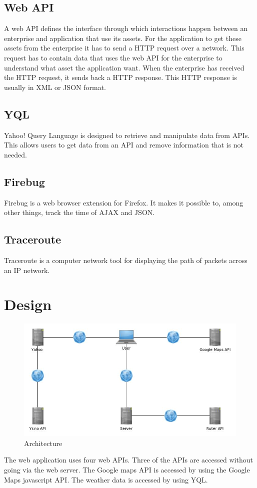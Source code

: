 \documentclass[10pt,a4paper]{article}
\begin{document}
\subsection{Web API}
A web API defines the interface through which interactions happen between an enterprise and application that use its assets. For the application to get these assets from the enterprise it has to send a HTTP request over a network. This request has to contain data that uses the web API for the enterprise to understand what asset the application want. When the enterprise has received the HTTP request, it sends back a HTTP response. This HTTP response is usually in XML or JSON format.

\subsection{YQL}
Yahoo! Query Language is designed to retrieve and manipulate data from APIs. This allows users to get data from an API and remove information that is not needed.
\subsection{Firebug}
Firebug is a web browser extension for Firefox. It makes it possible to, among other things, track the time of AJAX and JSON.

\subsection{Traceroute}
Traceroute is a computer network tool for displaying the path of packets across an IP network.
\section{Design}
\begin{figure}
\centering
\includegraphics[width=\textwidth]{../arch/arch}
\caption{Architecture}
\label{fig:arch}
\end{figure}
The web application uses four web APIs. Three of the APIs are accessed without going via the web server. The Google maps API is accessed by using the Google Maps javascript API. The weather data is accessed by using YQL. 
\end{document}
